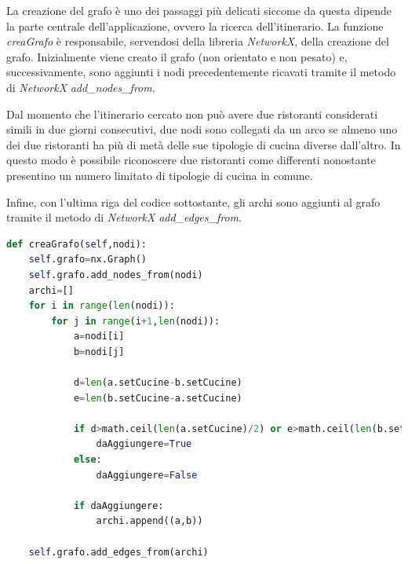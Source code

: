 \documentclass{report}
\begin{document}
La creazione del grafo è uno dei passaggi più delicati siccome da questa dipende la parte centrale dell'applicazione, ovvero la ricerca dell'itinerario. La funzione \textit{creaGrafo} è responsabile, servendosi della libreria \textit{NetworkX}, della creazione del grafo. Inizialmente viene creato il grafo (non orientato e non pesato) e, successivamente, sono aggiunti i nodi precedentemente ricavati tramite il metodo di \textit{NetworkX} \textit{add\_nodes\_from}.

Dal momento che l'itinerario cercato non può avere due ristoranti considerati simili in due giorni consecutivi, due nodi sono collegati da un arco se almeno uno dei due ristoranti ha più di metà delle sue tipologie di cucina diverse dall'altro. In questo modo è possibile riconoscere due ristoranti come differenti nonostante presentino un numero limitato di tipologie di cucina in comune.


Infine, con l'ultima riga del codice sottostante, gli archi sono aggiunti al grafo tramite il metodo di \textit{NetworkX} \textit{add\_edges\_from}.
\begin{lstlisting}[language=Python,caption=Funzione che crea il grafo]
def creaGrafo(self,nodi):
    self.grafo=nx.Graph()
    self.grafo.add_nodes_from(nodi)
    archi=[]
    for i in range(len(nodi)):
        for j in range(i+1,len(nodi)):
            a=nodi[i]
            b=nodi[j]

            d=len(a.setCucine-b.setCucine)
            e=len(b.setCucine-a.setCucine)

            if d>math.ceil(len(a.setCucine)/2) or e>math.ceil(len(b.setCucine)/2): 
                daAggiungere=True
            else:
                daAggiungere=False

            if daAggiungere:
                archi.append((a,b))

    self.grafo.add_edges_from(archi)
\end{lstlisting}
\end{document}
